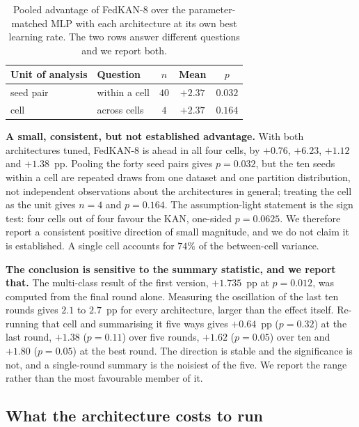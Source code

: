 \begin{table}[t]
\caption{Pooled advantage of FedKAN-8 over the parameter-matched MLP with each architecture at
its own best learning rate. The two rows answer different questions and we report both.}
\label{tab:pooled}
\centering
\footnotesize
\begin{tabular}{@{}llccc@{}}
\toprule
Unit of analysis & Question & $n$ & Mean & $p$ \\
\midrule
seed pair & within a cell        & $40$ & $+2.37$ & $0.032$ \\
cell      & across cells         & $4$  & $+2.37$ & $0.164$ \\
\bottomrule
\end{tabular}
\end{table}

\textbf{A small, consistent, but not established advantage.} With both architectures tuned,
FedKAN-8 is ahead in all four cells, by $+0.76$, $+6.23$, $+1.12$ and $+1.38$~pp. Pooling the
forty seed pairs gives $p=0.032$, but the ten seeds within a cell are repeated draws from one
dataset and one partition distribution, not independent observations about the architectures
in general; treating the cell as the unit gives $n=4$ and $p=0.164$. The assumption-light
statement is the sign test: four cells out of four favour the KAN, one-sided $p=0.0625$. We
therefore report a consistent positive direction of small magnitude, and we do not claim it is
established. A single cell accounts for $74\%$ of the between-cell variance.

\textbf{The conclusion is sensitive to the summary statistic, and we report that.} The
multi-class result of the first version, $+1.735$~pp at $p=0.012$, was computed from the final
round alone. Measuring the oscillation of the last ten rounds gives $2.1$ to $2.7$~pp for every
architecture, larger than the effect itself. Re-running that cell and summarising it five ways
gives $+0.64$~pp ($p=0.32$) at the last round, $+1.38$ ($p=0.11$) over five rounds, $+1.62$
($p=0.05$) over ten and $+1.80$ ($p=0.05$) at the best round. The direction is stable and the
significance is not, and a single-round summary is the noisiest of the five. We report the
range rather than the most favourable member of it.

\subsection{What the architecture costs to run}\label{sec:cost}

